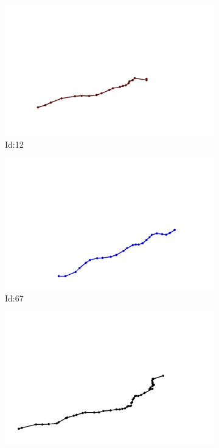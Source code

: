 \documentclass[12pt,twoside]{report}
\begin{document}
\begin{figure}
\centering
\begin{subfigure}[b]{0.20\textwidth}
\centering
\includegraphics[width=\textwidth]{../../trajectories/12.png}
\caption{Id:12}
\end{subfigure}
\begin{subfigure}[b]{0.20\textwidth}
\centering
\includegraphics[width=\textwidth]{../../trajectories/67.png}
\caption{Id:67}
\end{subfigure}
\begin{subfigure}[b]{0.20\textwidth}
\centering
\includegraphics[width=\textwidth]{../../trajectories/70.png}

\end{subfigure}
\end{figure}
\end{document}
